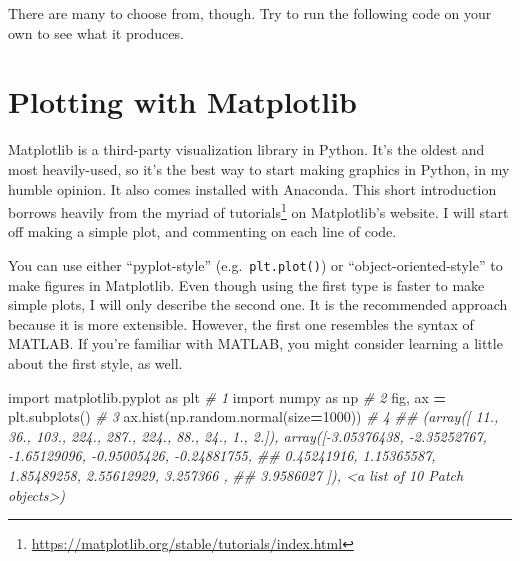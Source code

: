 \documentclass[
  12pt,
  krantz2]{krantz}
\makeatletter
\newenvironment{Shaded}{\begin{snugshade}}{\end{snugshade}}
\newcommand{\AttributeTok}[1]{\textcolor[rgb]{0.61,0.61,0.61}{#1}}
\newcommand{\CommentTok}[1]{\textcolor[rgb]{0.37,0.37,0.37}{\textit{#1}}}
\newcommand{\DecValTok}[1]{\textcolor[rgb]{0.06,0.06,0.06}{#1}}
\newcommand{\FunctionTok}[1]{\textcolor[rgb]{0,0,0}{#1}}
\newcommand{\ImportTok}[1]{#1}
\newcommand{\NormalTok}[1]{#1}
\newcommand{\OperatorTok}[1]{\textcolor[rgb]{0.43,0.43,0.43}{\textbf{#1}}}
\newcommand{\OtherTok}[1]{\textcolor[rgb]{0.37,0.37,0.37}{#1}}
\newcommand{\SpecialCharTok}[1]{\textcolor[rgb]{0,0,0}{#1}}
\renewcommand{\href}[2]{#2\footnote{\url{#1}}}
\newenvironment{kframe}{%
\medskip{}
\setlength{\fboxsep}{.8em}
 \def\at@end@of@kframe{}%
 \ifinner\ifhmode%
  \def\at@end@of@kframe{\end{minipage}}%
  \begin{minipage}{\columnwidth}%
 \fi\fi%
 \def\FrameCommand##1{\hskip\@totalleftmargin \hskip-\fboxsep
 \colorbox{shadecolor}{##1}\hskip-\fboxsep
     \hskip-\linewidth \hskip-\@totalleftmargin \hskip\columnwidth}%
 \MakeFramed {\advance\hsize-\width
   \@totalleftmargin\z@ \linewidth\hsize
   \@setminipage}}%
 {\par\unskip\endMakeFramed%
 \at@end@of@kframe}
\renewenvironment{Shaded}{\begin{kframe}}{\end{kframe}}
\makeatother
\begin{document}
There are many to choose from, though. Try to run the following code on your own to see what it produces.

\begin{Shaded}
\end{Shaded}

\hypertarget{plotting-with-matplotlib}{%
\section{Plotting with Matplotlib}\label{plotting-with-matplotlib}}

Matplotlib \citep{Hunter:2007} is a third-party visualization library in Python. It's the oldest and most heavily-used, so it's the best way to start making graphics in Python, in my humble opinion. It also comes installed with Anaconda. This short introduction borrows heavily from the myriad of \href{https://matplotlib.org/stable/tutorials/index.html}{tutorials} on Matplotlib's website. I will start off making a simple plot, and commenting on each line of code.

You can use either ``pyplot-style'' (e.g.~\texttt{plt.plot()}) or ``object-oriented-style'' to make figures in Matplotlib. Even though using the first type is faster to make simple plots, I will only describe the second one. It is the recommended approach because it is more extensible. However, the first one resembles the syntax of MATLAB. If you're familiar with MATLAB, you might consider learning a little about the first style, as well.

\begin{Shaded}
\begin{Highlighting}[]
\ImportTok{import}\NormalTok{ matplotlib.pyplot }\ImportTok{as}\NormalTok{ plt       }\CommentTok{\# 1}
\ImportTok{import}\NormalTok{ numpy }\ImportTok{as}\NormalTok{ np                    }\CommentTok{\# 2}
\NormalTok{fig, ax }\OperatorTok{=}\NormalTok{ plt.subplots()              }\CommentTok{\# 3}
\NormalTok{ax.hist(np.random.normal(size}\OperatorTok{=}\DecValTok{1000}\NormalTok{))  }\CommentTok{\# 4}
\CommentTok{\#\# (array([ 11.,  36., 103., 224., 287., 224.,  88.,  24.,   1.,   2.]), array([{-}3.05376438, {-}2.35252767, {-}1.65129096, {-}0.95005426, {-}0.24881755,}
\CommentTok{\#\#         0.45241916,  1.15365587,  1.85489258,  2.55612929,  3.257366  ,}
\CommentTok{\#\#         3.9586027 ]), \textless{}a list of 10 Patch objects\textgreater{})}
\end{Highlighting}
\end{Shaded}
\end{document}
